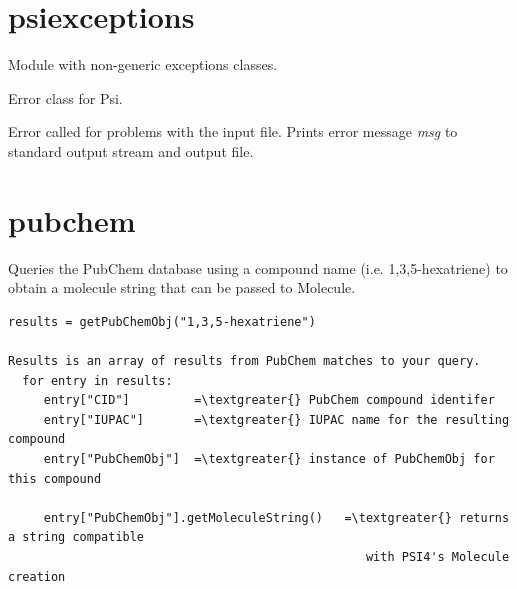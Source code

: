 \documentclass[letterpaper,10pt,english]{sphinxmanual}
\begin{document}
\section{psiexceptions}
\label{index:module-psiexceptions}\label{index:psiexceptions}
Module with non-generic exceptions classes.

\begin{fulllineitems}
\label{index:psiexceptions.PsiException}
Error class for Psi.

\end{fulllineitems}


\begin{fulllineitems}
\label{index:psiexceptions.ValidationError}
Error called for problems with the input file. Prints
error message \emph{msg} to standard output stream and output file.

\end{fulllineitems}



\section{pubchem}
\label{index:pubchem}\label{index:module-pubchem}
Queries the PubChem database using a compound name (i.e. 1,3,5-hexatriene)
to obtain a molecule string that can be passed to Molecule.

\begin{Verbatim}[commandchars=\\\{\}]
results = getPubChemObj("1,3,5-hexatriene")

Results is an array of results from PubChem matches to your query.
  for entry in results:
     entry["CID"]         =\textgreater{} PubChem compound identifer
     entry["IUPAC"]       =\textgreater{} IUPAC name for the resulting compound
     entry["PubChemObj"]  =\textgreater{} instance of PubChemObj for this compound

     entry["PubChemObj"].getMoleculeString()   =\textgreater{} returns a string compatible
                                                  with PSI4's Molecule creation
\end{Verbatim}
\end{document}
